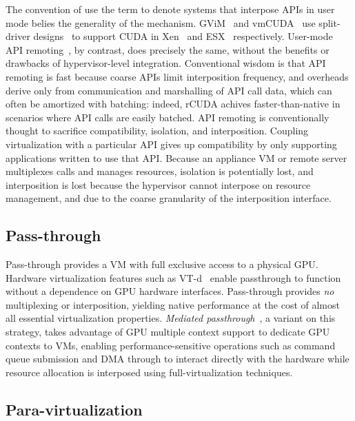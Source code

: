 The convention of use the term to denote systems that interpose APIs in user mode
belies the generality of the mechanism.
GViM~\cite{gupta2009gvim,vCUDA,gVirtuS} and vmCUDA~\cite{vmCUDA} use split-driver designs~\cite{pegasus,xen}
to support CUDA in Xen~\cite{xen} and ESX~\cite{esx} respectively.
User-mode API remoting~\cite{rCUDA, rCUDAnew,GridCuda,kim2012snucl,VCL,
	Duato:2009:EIG:1884795.1884840,Li:2011:GRS:2066302.2066933, Xiao:2012:TAM:2310096.2310143}, by contrast, does precisely the same, without the benefits or drawbacks
of hypervisor-level integration. Conventional wisdom is that API remoting is fast because coarse APIs limit interposition
frequency, and overheads derive only from communication and marshalling of API call data, which can often be amortized with batching:
indeed, rCUDA achives faster-than-native in scenarios where API calls are easily batched.
API remoting is conventionally thought to sacrifice compatibility, isolation, and interposition. Coupling
virtualization with a particular API gives up compatibility by only supporting applications written to use that API.
Because an appliance VM or remote server multiplexes calls and manages resources, isolation is potentially lost,
and interposition is lost because the hypervisor cannot interpose on resource management, and due to the coarse granularity of
the interposition interface.

\subsection{Pass-through}

Pass-through provides a VM with full exclusive access to a physical GPU.
Hardware virtualization features such as VT-d~\cite{abramson2006intel} enable passthrough
to function without a dependence on GPU hardware interfaces. Pass-through
provides \emph{no} multiplexing or interposition, yielding native performance
at the cost of almost all essential virtualization properties.
\emph{Mediated passthrough}~\cite{gVirt}, a variant on this strategy,
takes advantage of GPU multiple context support to dedicate GPU contexts
to VMs, enabling performance-sensitive operations such as command queue
submission and DMA through to interact directly with the hardware
while resource allocation is interposed using full-virtualization techniques.


\subsection{Para-virtualization}

